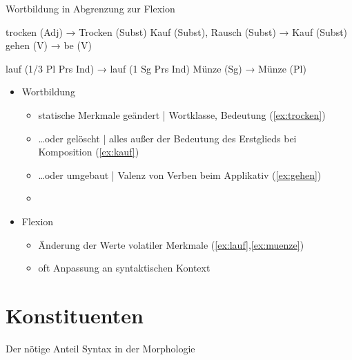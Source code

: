 \begin{frame}
  {Wortbildung in Abgrenzung zur Flexion}
  \pause
  \begin{exe}
    \ex
    \begin{xlist}
      \ex trocken (Adj) → \alert{Trocken} (Subst)\label{ex:trocken}
      \ex Kauf (Subst), Rausch (Subst) → \alert{Kauf} (Subst)\label{ex:kauf}
      \ex gehen (V) → \alert{be} (V)\label{ex:gehen}
    \end{xlist}
    \pause
    \ex
    \begin{xlist}
      \ex \alert{lauf} (1\slash 3 Pl Prs Ind) → \alert{lauf} (1 Sg Prs Ind)\label{ex:lauf}
      \ex \alert{Münze} (Sg) → \alert{Münze} (Pl)\label{ex:muenze}
    \end{xlist}
  \end{exe}
  \pause
  \Halbzeile
  \begin{itemize}[<+->]
    \item Wortbildung
      \begin{itemize}[<+->]
        \item statische Merkmale geändert | Wortklasse, Bedeutung \alert{(\ref{ex:trocken})}
        \item \ldots oder gelöscht | alles außer der Bedeutung des Erstglieds bei Komposition \alert{(\ref{ex:kauf})}
        \item \ldots oder umgebaut | Valenz von Verben beim Applikativ \alert{(\ref{ex:gehen})}
        \item {}
      \end{itemize}
  \Halbzeile
    \item Flexion
      \begin{itemize}
        \item Änderung der Werte volatiler Merkmale \alert{(\ref{ex:lauf},\ref{ex:muenze})}
        \item \alert{oft Anpassung an syntaktischen Kontext}
      \end{itemize}
  \end{itemize}
\end{frame}


\section{Konstituenten}


\begin{frame}
  {Der nötige Anteil Syntax in der Morphologie}
  
\end{frame}

